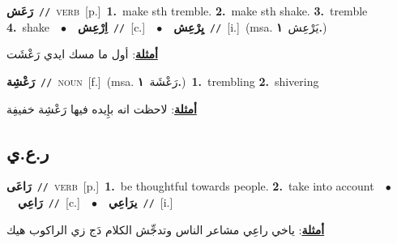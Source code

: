 \documentclass[10pt,a4paper,twoside]{article} %
\begin{document}
\begin{multicols}{2}
{\setlength\topsep{0pt}\textbf{\foreignlanguage{arabic}{رَعَش}}\ {\color{gray}\texttt{//}\color{black}}\ \textsc{verb}\ [p.]\ \textbf{1.}~make sth tremble.  \textbf{2.}~make sth shake.  \textbf{3.}~tremble  \textbf{4.}~shake\ \ $\bullet$\ \ \setlength\topsep{0pt}\textbf{\foreignlanguage{arabic}{اِرْعِش}}\ {\color{gray}\texttt{//}\color{black}}\ [c.]\ \ $\bullet$\ \ \setlength\topsep{0pt}\textbf{\foreignlanguage{arabic}{يِرْعِش}}\ {\color{gray}\texttt{//}\color{black}}\ [i.]\ \color{gray}(msa. \foreignlanguage{arabic}{يَرْعِش}~\foreignlanguage{arabic}{\textbf{١.}})\color{black}\  \begin{flushright}\color{gray}\foreignlanguage{arabic}{\textbf{\underline{\foreignlanguage{arabic}{أمثلة}}}: أول ما مسك ايدي رَعْشَت}\end{flushright}\color{black}} \vspace{2mm}

{\setlength\topsep{0pt}\textbf{\foreignlanguage{arabic}{رَعْشِة}}\ {\color{gray}\texttt{//}\color{black}}\ \textsc{noun}\ [f.]\ \color{gray}(msa. \foreignlanguage{arabic}{رَعْشَة}~\foreignlanguage{arabic}{\textbf{١.}})\color{black}\ \textbf{1.}~trembling  \textbf{2.}~shivering\  \begin{flushright}\color{gray}\foreignlanguage{arabic}{\textbf{\underline{\foreignlanguage{arabic}{أمثلة}}}: لاحظت انه بإِيده فيها رَعْشِة خفيفِة}\end{flushright}\color{black}} \vspace{2mm}

\vspace{-3mm}
\subsection*{\color{blue}\foreignlanguage{arabic}{ر.ع.ي}\color{blue}{}} 

{\setlength\topsep{0pt}\textbf{\foreignlanguage{arabic}{رَاعَى}}\ {\color{gray}\texttt{//}\color{black}}\ \textsc{verb}\ [p.]\ \textbf{1.}~be thoughtful towards people.  \textbf{2.}~take into account\ \ $\bullet$\ \ \setlength\topsep{0pt}\textbf{\foreignlanguage{arabic}{رَاعِي}}\ {\color{gray}\texttt{//}\color{black}}\ [c.]\ \ $\bullet$\ \ \setlength\topsep{0pt}\textbf{\foreignlanguage{arabic}{يرَاعِي}}\ {\color{gray}\texttt{//}\color{black}}\ [i.]\  \begin{flushright}\color{gray}\foreignlanguage{arabic}{\textbf{\underline{\foreignlanguage{arabic}{أمثلة}}}: ياخي راعِي مشاعر الناس وتدجِّش الكلام دَج زي الراكوب هيك}\end{flushright}\color{black}} \vspace{2mm}


\end{multicols}
\end{document}
